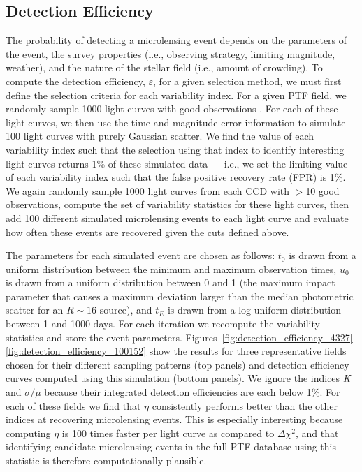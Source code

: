 \documentclass{emulateapj}
\newcommand{\apwsim}{\raisebox{0.2ex}{\scriptsize$\sim$\normalsize}}
\begin{document}
\subsection{Detection Efficiency}
The probability of detecting a microlensing event depends on the parameters of the event, the survey properties (i.e., observing strategy, limiting magnitude, weather), and the nature of the stellar field (i.e., amount of crowding).  To compute the detection efficiency, $\varepsilon$, for a given selection method, we must first define the selection criteria for each variability index. For a given PTF field, we randomly sample 1000 light curves with good observations \citep[these have no ``bad'' photometric flags; see description of processing pipeline in][]{nick2009}. For each of these light curves, we then use the time and magnitude error information to simulate 100 light curves with purely Gaussian scatter. We find the value of each variability index such that the selection using that index to identify interesting light curves returns 1\% of these simulated data --- i.e., we set the limiting value of each variability index such that the false positive recovery rate (FPR) is 1\%. We again randomly sample 1000 light curves from each CCD with $>$10 good observations, compute the set of variability statistics for these light curves, then add 100 different simulated microlensing events to each light curve and evaluate how often these events are recovered given the cuts defined above. 

The parameters for each simulated event are chosen as follows: $t_0$ is drawn from a uniform distribution between the minimum and maximum observation times, $u_0$ is drawn from a uniform distribution between 0 and 1 (the maximum impact parameter that causes a maximum deviation larger than the median photometric scatter for an $R\sim16$ source), and $t_E$ is drawn from a log-uniform distribution between 1 and 1000 days. For each iteration we recompute the variability statistics and store the event parameters. Figures~\ref{fig:detection_efficiency_4327}-\ref{fig:detection_efficiency_100152} show the results for three representative fields chosen for their different sampling patterns (top panels) and detection efficiency curves computed using this simulation (bottom panels). We ignore the indices \textit{K} and $\sigma/\mu$ because their integrated detection efficiencies are each below 1\%. For each of these fields we find that $\eta$ consistently performs better than the other indices at recovering microlensing events. This is especially interesting because computing $\eta$ is \apwsim100 times faster per light curve as compared to $\Delta\chi^2$, and that identifying candidate microlensing events in the full PTF database using this statistic is therefore computationally plausible.
	
\end{document}
